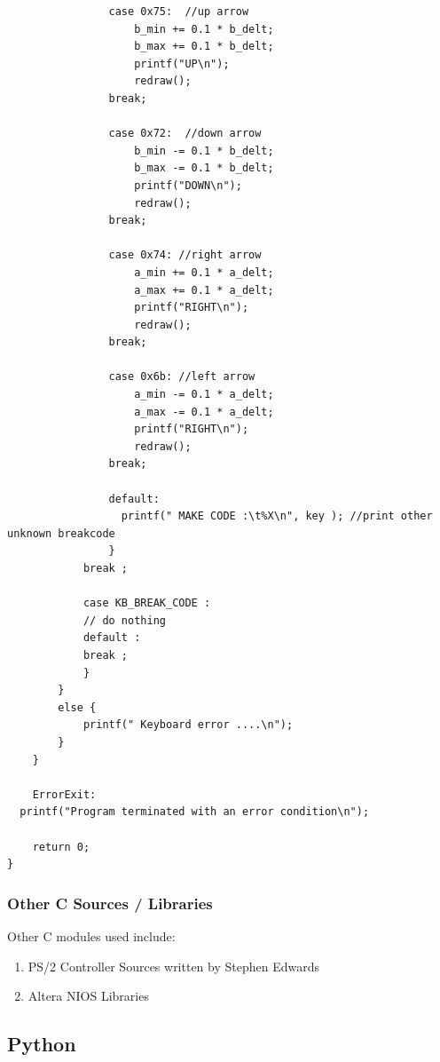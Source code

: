 \documentclass{article}
\begin{document}
\begin{lstlisting}
                case 0x75:  //up arrow
                    b_min += 0.1 * b_delt;
                    b_max += 0.1 * b_delt;                    
                    printf("UP\n");
                    redraw();
                break;
                
                case 0x72:  //down arrow
                    b_min -= 0.1 * b_delt;
                    b_max -= 0.1 * b_delt;                    
                    printf("DOWN\n");
                    redraw();
                break;
                
                case 0x74: //right arrow
                    a_min += 0.1 * a_delt;
                    a_max += 0.1 * a_delt;                    
                    printf("RIGHT\n");
                    redraw();
                break;
                
                case 0x6b: //left arrow
                    a_min -= 0.1 * a_delt;
                    a_max -= 0.1 * a_delt;                    
                    printf("RIGHT\n");
                    redraw();
                break;
                
                default:
                  printf(" MAKE CODE :\t%X\n", key ); //print other unknown breakcode
                }
            break ;
            
            case KB_BREAK_CODE :
            // do nothing
            default :
            break ;
            }
        }
        else {
            printf(" Keyboard error ....\n");
        }
    }
    
    ErrorExit:
  printf("Program terminated with an error condition\n");
    
    return 0;
}
\end{lstlisting}
\subsubsection{Other C Sources / Libraries}
Other C modules used include:
\begin{enumerate}{}
\item PS/2 Controller Sources written by Stephen Edwards
\item Altera NIOS Libraries
\end{enumerate}

\subsection{Python}
\end{document}
